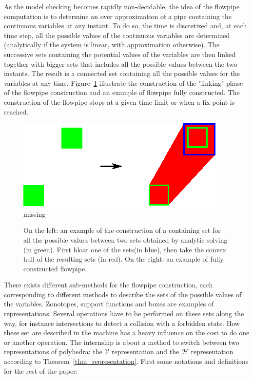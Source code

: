 As the model checking becomes rapidly non-decidable, the idea of the flowpipe computation is to determine an over approximation of a pipe containing the continuous variables at any instant. To do so, the time is discretized and, at each time step, all the possible values of the continuous variables are determined (analytically if the system is linear, with approximation otherwise). The successive sets containing the potential values of the variables are then linked together with bigger sets that includes all the possible values between the two instants. The result is a connected set containing all the possible values for the variables at any time. Figure~\ref{fowpipeconstruction} illustrate the construction of the "linking" phase of the flowpipe construction and an example of flowpipe fully constructed. The construction of the flowpipe stops at a given time limit or when a fix point is reached.

\begin{figure}
\includegraphics[scale=1.2]{images/flowpipe.eps}
missing
\caption{On the left: an example of the construction of a containing set for all the possible values between two sets obtained by analytic solving (in green). First bloat one of the sets(in blue), then take the convex hull of the resulting sets (in red). On the right: an example of fully constructed flowpipe.}
\label{fowpipeconstruction}
\end{figure}

There exists different sub-methods for the flowpipe construction, each corresponding to different methods to describe the sets of the possible values of the variables. Zonotopes, support functions and boxes are examples of representations. Several operations have to be performed on these sets along the way, for instance intersections to detect a collision with a forbidden state. How these set are described in the machine has a heavy influence on the cost to do one or another operation. The internship is about a method to switch between two representations of polyhedra: the $\mathcal{V}$ representation and the $\mathcal{H}$ representation according to Theorem~\ref{thm_representation}. First some notations and definitions for the rest of the paper:
 
